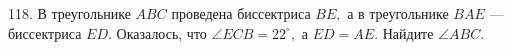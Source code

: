 118. В треугольнике $ABC$ проведена биссектриса $BE,$ а в треугольнике $BAE$ --- биссектриса $ED.$ Оказалось, что $\angle ECB=22^\circ,$ а $ED=AE.$ Найдите $\angle ABC.$\\
